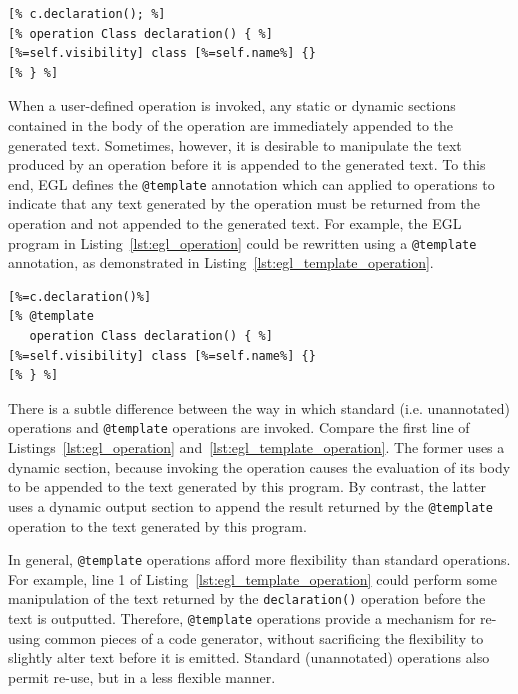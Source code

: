 \begin{lstlisting}[basicstyle=\ttfamily\footnotesize, language=EGL, tabsize=2, flexiblecolumns=true, caption=Using an operation to specify the text generated for a declaration of a Java class., label=lst:egl_operation]
[% c.declaration(); %]
[% operation Class declaration() { %]
[%=self.visibility] class [%=self.name%] {}
[% } %]
\end{lstlisting}

When a user-defined operation is invoked, any static or dynamic sections contained 
in the body of the operation are immediately appended to the generated text. Sometimes, 
however, it is desirable to manipulate the text produced by an operation before it is
appended to the generated text. To this end, EGL defines the \texttt{@template} annotation
which can applied to operations to indicate that any text generated by the operation
must be returned from the operation and not appended to the generated text. For example,
the EGL program in Listing~\ref{lst:egl_operation} could be rewritten using a \texttt{@template}
annotation, as demonstrated in Listing~\ref{lst:egl_template_operation}.

\begin{lstlisting}[float=tbp, basicstyle=\ttfamily\footnotesize, language=EGL, tabsize=2, flexiblecolumns=true, caption=Using a template operation to specify the text generated for a declaration of a Java class., label=lst:egl_template_operation]
[%=c.declaration()%]
[% @template
   operation Class declaration() { %]
[%=self.visibility] class [%=self.name%] {}
[% } %]
\end{lstlisting}

There is a subtle difference between the way in which standard (i.e. unannotated)
operations and \texttt{@template} operations are invoked. Compare the first line of Listings~\ref{lst:egl_operation} and~\ref{lst:egl_template_operation}. The former
uses a dynamic section, because invoking the operation causes the evaluation of 
its body to be appended to the text generated by this program. By contrast, the 
latter uses a dynamic output section to append the result returned by 
the \texttt{@template} operation to the text generated by this program.

In general, \texttt{@template} operations afford more flexibility than standard
operations. For example, line 1 of Listing~\ref{lst:egl_template_operation} could
perform some manipulation of the text returned by the \texttt{declaration()} operation
before the text is outputted. Therefore, \texttt{@template} operations provide
a mechanism for re-using common pieces of a code generator, without sacrificing the
flexibility to slightly alter text before it is emitted. Standard (unannotated) 
operations also permit re-use, but in a less flexible manner.

